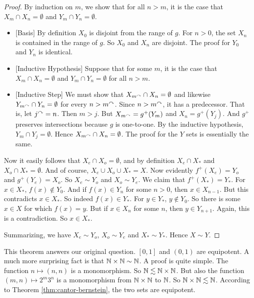 \begin{theorem}
\begin{proof}
 	By induction on $m$, we show that for all $n>m$, it is the case that $X_m\cap X_{n}=\emptyset$ and $Y_m\cap Y_{n}=\emptyset$.
 	\begin{itemize}
 		\item{}[Basis] By definition $X_0$ is disjoint from the range of $g$. For $n>0$, the set $X_{n}$ is contained in the range of $g$. So $X_0$ and $X_{n}$ are disjoint. 
 		The proof for $Y_0$ and $Y_{n}$ is identical.
 		\item{}[Inductive Hypothesis] Suppose that for some $m$, it is the case that $X_{m}\cap X_{n}=\emptyset$ and $Y_m \cap Y_{n}=\emptyset$ for all $n>m$.
 		\item{}[Inductive Step] We must show that $X_{m^\curvearrowright}\cap X_{n}=\emptyset$ and likewise $Y_{m^\curvearrowright}\cap Y_{n}=\emptyset$ for every $n>m^\curvearrowright$. Since $n>m^\curvearrowright$, it has a predecessor. That is, let $j^\curvearrowright = n$. Then $m > j$. 
 		But $X_{m^\curvearrowright} = g^+(Y_m)$ and $X_{n}=g^+(Y_j)$. And $g^+$ preserves intersections because $g$ is one-to-one.
 		By the inductive hypothesis, $Y_m\cap Y_{j}=\emptyset$. Hence $X_{m^\curvearrowright}\cap X_n=\emptyset$. 		
 		The proof for the $Y$ sets is essentially the same. 
 	\end{itemize}
 	
 	Now it easily follows that $X_e\cap X_o=\emptyset$, and by definition $X_e\cap X_*$ and $X_o\cap X_*=\emptyset$.
 	And of course, $X_e\cup X_o\cup X_* = X$.
 	Now evidently $f^+(X_e)=Y_o$ and $g^+(Y_e)=X_o$. 
 	So $X_e\sim Y_o$ and $X_o\sim Y_e$. 
 	We claim that $f^+(X_*)=Y_*$. 
 	For $x\in X_*$, $f(x)\notin Y_0$. And if $f(x)\in Y_n$ for some $n>0$, then $x\in X_{n-1}$. But this contradicts $x\in X_*$. So indeed $f(x)\in Y_*$. For $y\in Y_*$, $y\notin Y_0$. So there is some $x\in X$ for which $f(x)=y$. But if $x\in X_n$ for some $n$, then $y\in Y_{n+1}$. Again, this is a contradiction. So $x\in X_*$.
 	
 	Summarizing, we have $X_e\sim Y_o$, $X_o\sim Y_e$ and $X_*\sim Y_*$. Hence $X\sim Y$.
 	\end{proof}
\end{theorem}

This theorem answers our original question. $[0,1]$ and $(0,1)$ are equipotent. 
A much more surprising fact is that $\mathbb N\times \mathbb N\sim \mathbb N$. A proof is quite simple. 
The function $n\mapsto (n,n)$ is a monomorphism. So $\mathbb N\lesssim\mathbb N\times\mathbb N$. 
But also the function $(m,n)\mapsto 2^m3^n$ is a monomorphism from $\mathbb N\times \mathbb N$ to $\mathbb N$. 
So $\mathbb N\times \mathbb N\lesssim\mathbb N$. 
According to Theorem \ref{thm:cantor-bernstein}, the two sets are equipotent.

